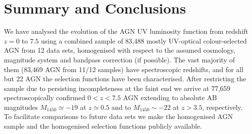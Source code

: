 \documentclass[fleqn,usenatbib]{mnras}
\def\lya{Ly$\alpha$~}
\def\HI{\hbox{H~$\scriptstyle\rm I$}}
\def\HeII{\hbox{He~$\scriptstyle\rm II$}}
\begin{document}

\section{Summary and Conclusions}
\label{sec:conc}

We have analysed the evolution of the AGN UV luminosity function from redshift $z=0$ to $7.5$
using a combined sample of 83,488 mostly UV-optical colour-selected AGN from 12 data sets,
homogenised with respect to the assumed cosmology, magnitude system and bandpass correction (if possible).
The vast majority of them (83,469 AGN from 11/12 samples) have spectroscopic redshifts,
and for all but 22 AGN the selection functions have been characterised.
After restricting the sample due to persisting incompleteness at the faint end we arrive at 77,659 spectroscopically
confirmed $0<z<7.5$ AGN extending to absolute AB magnitudes $M_{1450}\simeq -19$ at $z\simeq 0.5$
and to $M_{1450}\sim -22$ at $z>3.5$, respectively. 
To facilitate comparisons to future data sets we make the homogenised AGN sample and
the homogenised selection functions publicly available.
\end{document}
